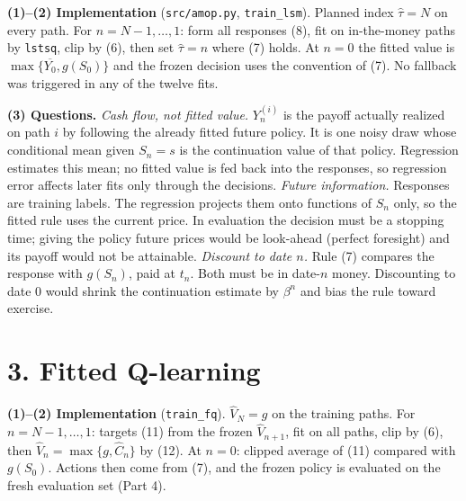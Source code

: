 \documentclass[10pt]{article}
\newcommand{\Ch}{\widehat C}
\newcommand{\Vh}{\widehat V}
\newcommand{\taub}{\widehat\tau}
\begin{document}
\textbf{(1)--(2) Implementation} (\texttt{src/amop.py}, \texttt{train\_lsm}). Planned index
$\taub=N$ on every path. For $n=N-1,\dots,1$: form all responses (8), fit on in-the-money paths by
\texttt{lstsq}, clip by (6), then set $\taub=n$ where (7) holds. At $n=0$ the fitted value is
$\max\{\overline{Y_0},g(S_0)\}$ and the frozen decision uses the convention of (7). No fallback was
triggered in any of the twelve fits.

\textbf{(3) Questions.}
\emph{Cash flow, not fitted value.} $Y^{(i)}_n$ is the payoff actually realized on path $i$ by
following the already fitted future policy. It is one noisy draw whose conditional mean given
$S_n=s$ is the continuation value of that policy. Regression estimates this mean; no fitted value is
fed back into the responses, so regression error affects later fits only through the decisions.
\emph{Future information.} Responses are training labels. The regression projects them onto
functions of $S_n$ only, so the fitted rule uses the current price. In evaluation the decision must
be a stopping time; giving the policy future prices would be look-ahead (perfect foresight) and its
payoff would not be attainable.
\emph{Discount to date $n$.} Rule (7) compares the response with $g(S_n)$, paid at $t_n$. Both must be in
date-$n$ money. Discounting to date 0 would shrink the continuation estimate by $\beta^n$ and bias
the rule toward exercise.

\section*{3. Fitted Q-learning}

\textbf{(1)--(2) Implementation} (\texttt{train\_fq}). $\Vh_N=g$ on the training paths. For
$n=N-1,\dots,1$: targets (11) from the frozen $\Vh_{n+1}$, fit on all paths, clip by (6), then
$\Vh_n=\max\{g,\Ch_n\}$ by (12). At $n=0$: clipped average of (11) compared with $g(S_0)$. Actions
then come from (7), and the frozen policy is evaluated on the fresh evaluation set (Part 4).
\end{document}
